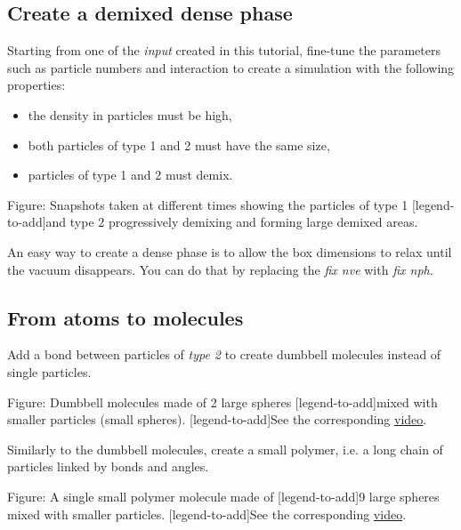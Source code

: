\subsection{Create a demixed dense phase}
Starting from one of the \textit{input} created in this tutorial,
fine-tune the parameters such as particle numbers and interaction
to create a simulation with the following properties:

\begin{itemize}
\item the density in particles must be high,
\item both particles of type 1 and 2 must have the same size,
\item particles of type 1 and 2 must demix. 
\end{itemize}

\vspace{0.25cm} Figure: Snapshots taken at different times showing the particles of type 1 
[legend-to-add]and type 2 progressively demixing and forming large demixed areas.  

\begin{tcolorbox}[colback=mylightblue!5!white,colframe=mylightblue!75!black,title=Hint]

\vspace{0.25cm} \noindent An easy way to create a dense phase is to allow the box dimensions 
to relax until the vacuum disappears. You can do that 
by replacing the \textit{fix nve} with \textit{fix nph}.
\end{tcolorbox}

\subsection{From atoms to molecules}
Add a bond between particles of \textit{type 2} to create
dumbbell molecules instead of single particles.

\vspace{0.25cm} Figure: Dumbbell molecules made of 2 large spheres
[legend-to-add]mixed with smaller particles (small spheres). 
[legend-to-add]See the corresponding \href{https://youtu.be/R_oHonOQi68}{video}.

\vspace{0.25cm} \noindent Similarly to the dumbbell molecules, create a small polymer,
i.e. a long chain of particles linked by bonds and angles.

\vspace{0.25cm} Figure: A single small polymer molecule made of
[legend-to-add]9 large spheres mixed with smaller particles. 
[legend-to-add]See the corresponding \href{https://youtu.be/LfqcfP3ZQcY}{video}.

